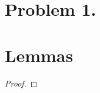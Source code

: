 \documentclass[12pt]{extarticle}
\begin{document}

\section*{Problem 1.}


\section*{Lemmas}

\begin{lemma} \label{complimentlem}

\end{lemma}
\begin{proof}

\end{proof}
\end{document}
